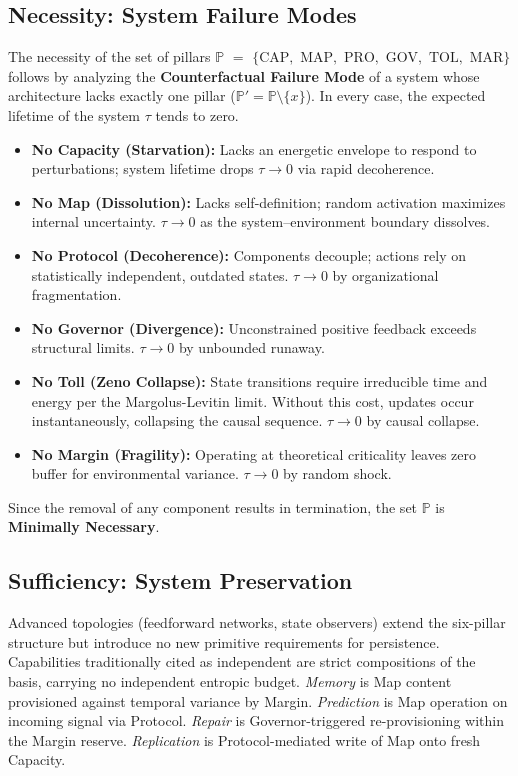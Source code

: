 \subsection{Necessity: System Failure Modes}
\label{subsec:pillars_necessity}
The necessity of the set of pillars $\mathbb{P}$ $=$ $\{\mathrm{CAP},$ $\mathrm{MAP},$ $\mathrm{PRO},$ $\mathrm{GOV},$ $\mathrm{TOL},$ $\mathrm{MAR}\}$ follows by analyzing the \textbf{Counterfactual Failure Mode} of a system whose architecture lacks exactly one pillar ($\mathbb{P}' = \mathbb{P} \setminus \{x\}$). In every case, the expected lifetime of the system $\tau$ tends to zero.
\begin{itemize}
    \item \textbf{No Capacity (Starvation):} Lacks an energetic envelope to respond to perturbations; system lifetime drops $\tau \to 0$ via rapid decoherence.
    \item \textbf{No Map (Dissolution):} Lacks self-definition; random activation maximizes internal uncertainty. $\tau \to 0$ as the system--environment boundary dissolves.
    \item \textbf{No Protocol (Decoherence):} Components decouple; actions rely on statistically independent, outdated states. $\tau \to 0$ by organizational fragmentation.
    \item \textbf{No Governor (Divergence):} Unconstrained positive feedback exceeds structural limits. $\tau \to 0$ by unbounded runaway.
    \item \textbf{No Toll (Zeno Collapse):} State transitions require irreducible time and energy per the Margolus-Levitin limit\cite{margolus_maximum_1998}. Without this cost, updates occur instantaneously, collapsing the causal sequence. $\tau \to 0$ by causal collapse.
    \item \textbf{No Margin (Fragility):} Operating at theoretical criticality leaves zero buffer for environmental variance. $\tau \to 0$ by random shock.
\end{itemize}

Since the removal of any component results in termination, the set $\mathbb{P}$ is \textbf{Minimally Necessary}.

\subsection{Sufficiency: System Preservation}
\label{subsec:pillars_sufficiency}
Advanced topologies (feedforward networks, state observers) extend the six-pillar structure but introduce no new primitive requirements for persistence. Capabilities traditionally cited as independent are strict compositions of the basis, carrying no independent entropic budget. \emph{Memory} is Map content provisioned against temporal variance by Margin. \emph{Prediction} is Map operation on incoming signal via Protocol. \emph{Repair} is Governor-triggered re-provisioning within the Margin reserve. \emph{Replication} is Protocol-mediated write of Map onto fresh Capacity.


